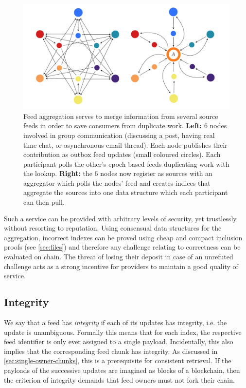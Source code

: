 \begin{figure}[htbp]
\centering
\includegraphics[width=\textwidth]{fig/feed-aggregation-2.pdf}
\caption[Feed aggregation \statusyellow]{Feed aggregation serves to merge information from several source feeds in order to save consumers from duplicate work. \textbf{Left:} 6 nodes involved in group communication (discussing a post, having real time chat, or asynchronous email thread). Each node publishes their contribution as outbox feed updates (small coloured circles). Each participant polls the other's epoch based feeds duplicating work with the lookup. \textbf{Right:} the 6 nodes now register  as sources  with an aggregator which polls the nodes' feed and creates indices that aggregate the sources into one data structure which each participant can then pull.}
\label{fig:feed-aggregation}
\end{figure}

Such a service can be provided with arbitrary levels of security, yet trustlessly without resorting to reputation. Using consensual data structures for the aggregation, incorrect indexes can be proved using cheap and compact inclusion proofs (see \ref{sec:files}) and therefore any challenge relating to correctness can be evaluated on chain. The threat of losing their deposit in case of an unrefuted challenge acts as a strong incentive for providers to maintain a good quality of service.

\subsection{Integrity \statusyellow}\label{sec:feed-integrity}

We say that a feed has \emph{integrity} if each of its updates has integrity, i.e. the update is unambiguous. Formally this means that for each index, the respective feed identifier is only ever assigned to a single payload. Incidentally, this also implies that the corresponding feed chunk has integrity. As discussed in \ref{sec:single-owner-chunks}, this is a prerequisite for consistent retrieval. 
If the payloads of the successive updates are imagined as blocks of a blockchain, then the criterion of integrity demands that feed owners must not fork their chain. 

